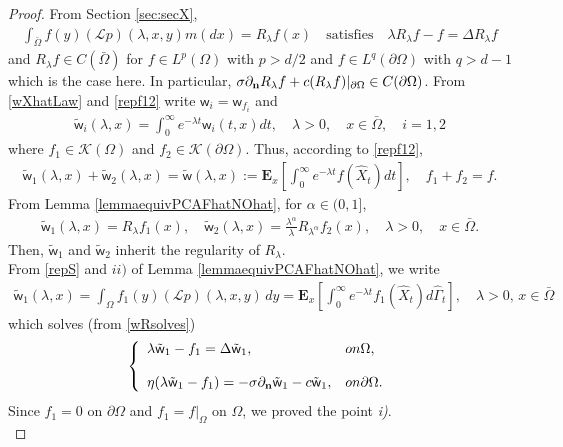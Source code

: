 \documentclass[11pt,a4paper]{article}
\begin{document}
\begin{proof}
From Section \ref{sec:secX}, 
\begin{align*}
\int_{\bar{\Omega}} f(y) (\mathcal{L}p)(\lambda,x,y)m(dx) = R_\lambda f(x) \quad \textrm{satisfies} \quad \lambda R_\lambda f - f = \Delta R_\lambda f
\end{align*}
and $R_\lambda f \in C(\bar{\Omega})$ for $f \in L^p(\Omega)$ with $p> d/2$ and $f \in L^q(\partial \Omega)$ with $q>d-1$ which is the case here. In particular, $\sigma \partial_{\bf n} R_\lambda f + c (R_\lambda f)|_{\partial \Omega} \in C(\partial \Omega)$. 
From \eqref{wXhatLaw} and \eqref{repf12} write $\mathsf{w}_i=\mathsf{w}_{f_i}$ and
\begin{align*}
\tilde{\mathsf{w}}_i (\lambda, x) = \int_0^\infty e^{-\lambda t} \mathsf{w}_i(t,x) dt, \quad \lambda >0, \quad x \in \bar{\Omega}, \quad i=1,2
\end{align*}
where $f_1 \in \mathcal{K}(\Omega)$ and $f_2 \in \mathcal{K}(\partial \Omega)$. Thus, according to \eqref{repf12},
\begin{align}
\tilde{\mathsf{w}}_1 (\lambda, x) + \tilde{\mathsf{w}}_2(\lambda, x) = \tilde{\mathsf{w}}(\lambda, x) := \mathbf{E}_x \left[ \int_0^\infty e^{-\lambda t} f(\hat{X}_t) dt \right], \quad f_1 + f_2 = f.
\label{Rhat}
\end{align}
From Lemma \ref{lemmaequivPCAFhatNOhat}, for $\alpha \in (0,1]$,
\begin{align}
\tilde{\mathsf{w}}_1 (\lambda, x) = R_\lambda f_1 (x), \quad \tilde{\mathsf{w}}_2 (\lambda, x) = \frac{\lambda^\alpha}{\lambda} R_{\lambda^\alpha} f_2 (x), \quad \lambda >0, \quad x \in \bar{\Omega}.
\label{wRsolves}
\end{align}
Then, $\tilde{\mathsf{w}}_1$ and $\tilde{\mathsf{w}}_2$ inherit the regularity of $R_\lambda$.\\


From \eqref{repS} and $ii)$ of Lemma \ref{lemmaequivPCAFhatNOhat}, we write
\begin{align*}
\tilde{\mathsf{w}}_1(\lambda, x) = \int_\Omega f_1(y) (\mathcal{L}p)(\lambda ,x,y) \, dy = \mathbf{E}_x\left[ \int_0^\infty e^{-\lambda t} f_1(\hat{X}_t) d\hat{\Gamma}_t \right], \quad \lambda >0,\, x \in \bar{\Omega}
\end{align*}
which solves (from \eqref{wRsolves}) 
\begin{equation*}
\left\lbrace
\begin{array}{ll}
\displaystyle \lambda \tilde{\mathsf{w}}_1 - f_1 = \Delta \tilde{\mathsf{w}}_1, & \textrm{on }  \Omega,\\
\\
\displaystyle \eta (\lambda \tilde{\mathsf{w}}_1 - f_1) = - \sigma \partial_{\bf n} \tilde{\mathsf{w}}_1 - c \tilde{\mathsf{w}}_1, & \textrm{on }  \partial \Omega.
\end{array}
\right.
\end{equation*}
Since $f_1=0$ on $\partial \Omega$ and $f_1 =f|_{\Omega}$ on $\Omega$, we proved the point \textit{i)}.\\ 


\end{proof}
\end{document}
